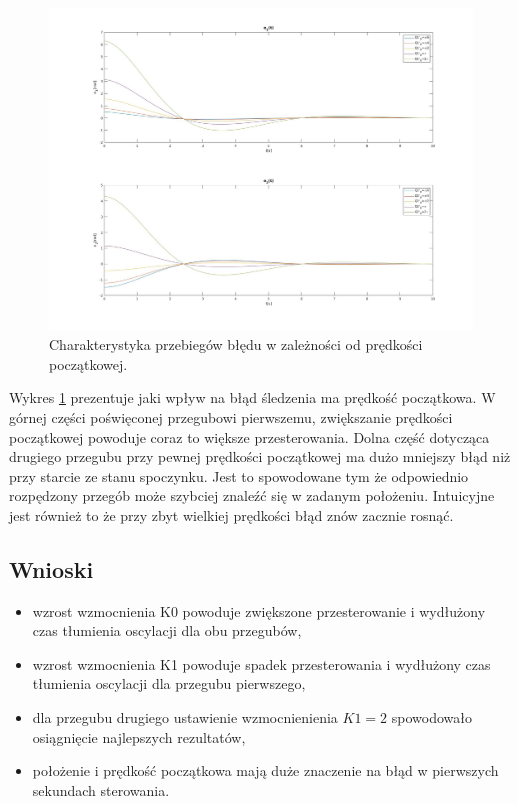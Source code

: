 \documentclass[12pt,a4paper]{article}
\begin{document}
  \begin{figure}[H]
    \centering
    \includegraphics[width=1\textwidth]{figures/lin4.jpg}
    \caption{Charakterystyka przebiegów błędu w zależności od prędkości początkowej.}
    \label{fig:lin4}
  \end{figure}

    Wykres \ref{fig:lin4} prezentuje jaki wpływ na błąd śledzenia ma prędkość początkowa. W górnej części poświęconej przegubowi pierwszemu, zwiększanie prędkości początkowej powoduje coraz to większe przesterowania. Dolna część dotycząca drugiego przegubu przy pewnej prędkości początkowej ma dużo mniejszy błąd niż przy starcie ze stanu spoczynku. Jest to spowodowane tym że odpowiednio rozpędzony przegób może szybciej znaleźć się w zadanym położeniu. Intuicyjne jest również to że przy zbyt wielkiej prędkości błąd znów zacznie rosnąć. 

  \subsection{Wnioski}

  \begin{itemize}
    \item wzrost wzmocnienia K0 powoduje zwiększone przesterowanie i wydłużony czas tłumienia oscylacji dla obu przegubów,
    \item wzrost wzmocnienia K1 powoduje spadek przesterowania i wydłużony czas tłumienia oscylacji dla przegubu pierwszego,
    \item dla przegubu drugiego ustawienie wzmocnienienia $K1=2$ spowodowało osiągnięcie najlepszych rezultatów,
    \item położenie i prędkość początkowa mają duże znaczenie na błąd w pierwszych sekundach sterowania. 
  \end{itemize}
  
\end{document}
